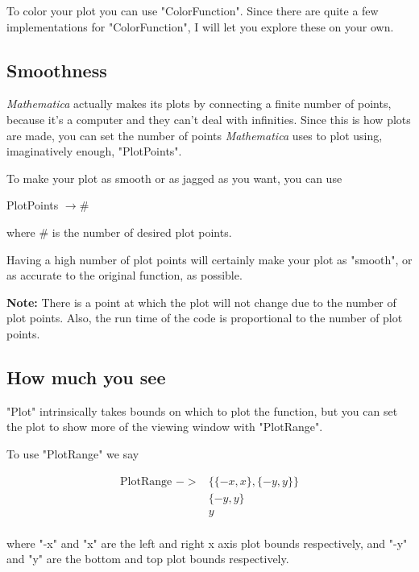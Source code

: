 \documentclass[11pt,letterpaper,twoside,titlepage]{report}
\newcommand{\Mathematica}{\textit{Mathematica} }
\begin{document}
					To color your plot you can use "ColorFunction".  Since there are quite a few implementations for "ColorFunction", I will let you explore these on your own.
						
				\subsection{Smoothness}
						
					\Mathematica actually makes its plots by connecting a finite number of points, because it's a computer and they can't deal with infinities.  Since this is how plots are made, you can set the number of points \Mathematica uses to plot using, imaginatively enough, "PlotPoints".
						
					To make your plot as smooth or as jagged as you want, you can use
						
					\begin{center} PlotPoints $ \rightarrow \# $ \end{center}
						
					where $ \# $ is the number of desired plot points.
						
					Having a high number of plot points will certainly make your plot as "smooth", or as accurate to the original function, as possible.
						
					\textbf{Note:} There is a point at which the plot will not change due to the number of plot points.  Also, the run time of the code is proportional to the number of plot points.
						
				\subsection{How much you see}
						
					"Plot" intrinsically takes bounds on which to plot the function, but you can set the plot to show more of the viewing window with "PlotRange".
						
					To use "PlotRange" we say
						
					\begin{align*}
						\text{PlotRange } ->& \{ \{ -x,x \} , \{ -y,y \} \} \\
											& \{ -y,y \} \\
											& y \\
					\end{align*}
						
					where "-x" and "x" are the left and right x axis plot bounds respectively, and "-y" and "y" are the bottom and top plot bounds respectively.
						
\end{document}
